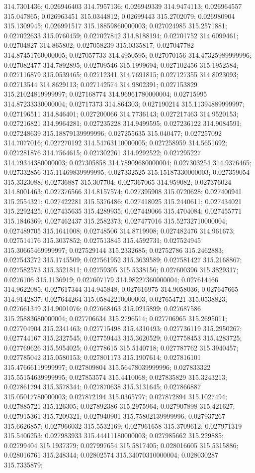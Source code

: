 314.7301436; 0.026946403 314.7957136; 0.026949339 314.9474113; 0.026964557 315.047865; 0.026963451 315.0344812; 0.02699443 315.2702079; 0.026980904 315.1309945; 0.026991517 315.18859860000003; 0.027024985 315.2571881; 0.027022633 315.0760459; 0.027027842 314.8188194; 0.02701752 314.6099461; 0.02704827 314.865802; 0.027058239 315.0335817; 0.027047782 314.87451760000005; 0.027057733 314.4950595; 0.027070156 314.47325989999996; 0.027082477 314.7892895; 0.02709546 315.1999694; 0.027102456 315.1952584; 0.027116879 315.0539465; 0.02712341 314.7691815; 0.027127355 314.8023093; 0.02713544 314.8629113; 0.027142574 314.9802391; 0.027153829 315.21024819999997; 0.027168774 314.96961780000004; 0.02715995 314.87233330000004; 0.02717373 314.864303; 0.027190214 315.11394889999997; 0.027196511 314.846401; 0.027200066 314.7736143; 0.027217463 314.9520153; 0.027216821 314.9964281; 0.027235228 314.9499595; 0.027236122 314.9084591; 0.027248639 315.18879139999996; 0.027255635 315.040477; 0.027257092 314.7077016; 0.027270192 314.54763110000005; 0.027258959 314.5651692; 0.027281876 314.7564615; 0.027302261 314.9292522; 0.027295227 314.79344380000003; 0.027305858 314.78909680000004; 0.027303254 314.9376465; 0.027332856 315.11469839999995; 0.027332525 315.15187330000003; 0.027359054 315.3323088; 0.02736887 315.307704; 0.027367065 314.959082; 0.027376024 314.8001463; 0.027376566 314.8157574; 0.027395908 315.0720628; 0.027400941 315.2554321; 0.027422281 315.5376486; 0.027418025 315.2440611; 0.027434021 315.2292425; 0.027435635 315.4289935; 0.027449066 315.4704084; 0.027455771 315.1846369; 0.027462437 315.2582373; 0.027477016 315.52732710000004; 0.027489705 315.1641008; 0.02748506 314.8719908; 0.027482476 314.961673; 0.027514176 315.3037852; 0.027513845 315.4592731; 0.027524945 315.30665469999997; 0.027529144 315.2332685; 0.02752786 315.2462883; 0.027543272 315.1745509; 0.027561952 315.3639589; 0.027581427 315.2168867; 0.027582573 315.3521811; 0.02759305 315.5338156; 0.027600396 315.3829317; 0.0276106 315.1136919; 0.027607179 314.98227360000004; 0.027614466 314.9622085; 0.027617344 314.945848; 0.027616975 314.9058036; 0.027647665 314.9142837; 0.027644264 315.05842210000003; 0.027654721 315.0538823; 0.027661349 314.9001076; 0.027668463 315.0215899; 0.027687586 315.25883680000004; 0.027706634 315.2796514; 0.027706965 315.2695011; 0.027704904 315.2341463; 0.027715498 315.4310493; 0.027736119 315.2950267; 0.027744167 315.2327545; 0.027759443 315.3620529; 0.027758453 315.4283725; 0.027769626 315.5954025; 0.02778615 315.5140718; 0.027787762 315.3940457; 0.027785042 315.0580153; 0.027801173 315.1907614; 0.027816101 315.47666119999997; 0.027809804 315.56478039999996; 0.027833322 315.55154639999995; 0.027853574 315.4410068; 0.027835829 315.3243213; 0.027861794 315.3578344; 0.027870638 315.3131645; 0.027866887 315.05017780000003; 0.027872194 315.0365797; 0.027872894 315.1027494; 0.027885721 315.126305; 0.027892386 315.2975964; 0.027907898 315.421627; 0.027915361 315.7209321; 0.027940901 315.75802139999996; 0.027937267 315.6626857; 0.027966032 315.5532169; 0.027961658 315.3709612; 0.027971319 315.5406253; 0.027983933 315.44411180000003; 0.027985662 315.229885; 0.02799404 315.1937379; 0.027997654 315.5817405; 0.028016605 315.5315886; 0.028016761 315.248344; 0.02802574 315.34070310000004; 0.028030287 315.7335879; 